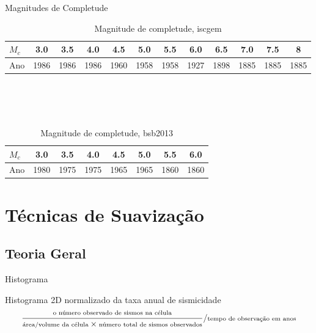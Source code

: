 \documentclass[ucs,8pt]{beamer}
\begin{document}
\begin{frame}[c]{Magnitudes de Completude}
	\begin{table}[h]
	  	\centering
	  	\footnotesize
		\begin{tabular}{l|*{11}{c}}
		$M_c$ & 3.0  & 3.5  & 4.0  & 4.5  & 5.0  & 5.5  & 6.0  & 6.5  & 7.0  & 7.5  & 8 \\  \hline
		Ano   & 1986 & 1986 & 1986 & 1960 & 1958 & 1958 & 1927 & 1898 & 1885 & 1885 & 1885   \\
		\end{tabular}
		\caption{Magnitude de completude, \gls{iscgem}}
		\label{tab:mc_sa}
	\end{table} \\
	\quad		\\
	\quad		\\
	\begin{table}[h]
	  	\centering
	  	\footnotesize
		\begin{tabular}{l|*{7}{c}}
		$M_c$ & 3.0  & 3.5  & 4.0  & 4.5  & 5.0  & 5.5  & 6.0  \\  \hline
		Ano   & 1980 & 1975 & 1975 & 1965 & 1965 & 1860 & 1860 \\
		\end{tabular}
		\caption{Magnitude de completude, \gls{bsb2013}}
		\label{tab:mc_br}
	\end{table}
\end{frame}



\section{Técnicas de Suavização}
\subsection{Teoria Geral}
\begin{frame}{Histograma}
	\begin{block}{Histograma 2D normalizado da taxa anual de sismicidade}
		\begin{equation}
		\scriptsize
			\ensuremath{
			\frac{\text{o número observado de sismos na célula}}
				 {\text{área/volume da célula} \times 
				  \text{número total de sismos observados}}
			/
			\text{tempo de observação em anos}
			}
		\label{eq:rate_count}
		\end{equation}
	\end{block}
\end{frame}
\end{document}
